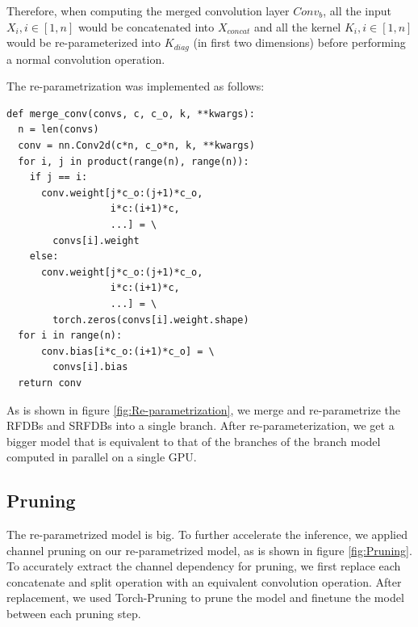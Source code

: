 \documentclass[10pt,twocolumn,letterpaper]{article}
\begin{document}
Therefore, when computing the merged convolution layer $Conv_b$, all the input $X_i, i\in[1,n]$ would be concatenated into $X_{concat}$ and all the kernel $K_i, i\in[1,n]$ would be re-parameterized into $K_{diag}$ (in first two dimensions) before performing a normal convolution operation.

The re-parametrization was implemented as follows:
\begin{verbatim}
def merge_conv(convs, c, c_o, k, **kwargs):
  n = len(convs)
  conv = nn.Conv2d(c*n, c_o*n, k, **kwargs)
  for i, j in product(range(n), range(n)):
    if j == i:
      conv.weight[j*c_o:(j+1)*c_o,
                  i*c:(i+1)*c,
                  ...] = \
        convs[i].weight
    else:
      conv.weight[j*c_o:(j+1)*c_o,
                  i*c:(i+1)*c,
                  ...] = \
        torch.zeros(convs[i].weight.shape)
  for i in range(n):
      conv.bias[i*c_o:(i+1)*c_o] = \
        convs[i].bias
  return conv
\end{verbatim}

As is shown in figure \ref{fig:Re-parametrization}, we merge and re-parametrize the RFDBs and SRFDBs into a single branch. 
After re-parameterization, we get a bigger model that is equivalent to that of the branches of the branch model computed in parallel on a single GPU.

\subsection{Pruning}
The re-parametrized model is big. To further accelerate the inference, we applied channel pruning on our re-parametrized model, as is shown in figure \ref{fig:Pruning}. To accurately extract the channel dependency for pruning, we first replace each concatenate and split operation with an equivalent convolution operation. After replacement, we used Torch-Pruning\cite{fang2023depgraph} to prune the model and finetune the model between each pruning step.
\end{document}
